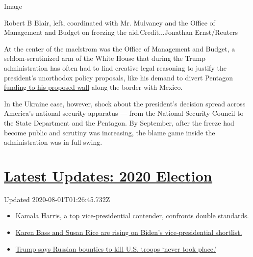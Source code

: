 Image

Robert B Blair, left, coordinated with Mr. Mulvaney and the Office of
Management and Budget on freezing the aid.Credit...Jonathan
Ernst/Reuters

At the center of the maelstrom was the Office of Management and Budget,
a seldom-scrutinized arm of the White House that during the Trump
administration has often had to find creative legal reasoning to justify
the president's unorthodox policy proposals, like his demand to divert
Pentagon
\href{https://www.nytimes.com/2019/09/03/us/politics/pentagon-border-wall.html}{funding
to his proposed wall} along the border with Mexico.

In the Ukraine case, however, shock about the president's decision
spread across America's national security apparatus --- from the
National Security Council to the State Department and the Pentagon. By
September, after the freeze had become public and scrutiny was
increasing, the blame game inside the administration was in full swing.

\hypertarget{latest-updates-2020-election}{%
\section{\texorpdfstring{\href{https://www.nytimes.com/2020/07/31/us/elections/biden-vs-trump.html?action=click\&pgtype=Article\&state=default\&region=MAIN_CONTENT_1\&context=storylines_live_updates}{Latest
Updates: 2020
Election}}{Latest Updates: 2020 Election}}\label{latest-updates-2020-election}}

Updated 2020-08-01T01:26:45.732Z

\begin{itemize}
\tightlist
\item
  \href{https://www.nytimes.com/2020/07/31/us/elections/biden-vs-trump.html?action=click\&pgtype=Article\&state=default\&region=MAIN_CONTENT_1\&context=storylines_live_updates\#link-29fdff45}{Kamala
  Harris, a top vice-presidential contender, confronts double
  standards.}
\item
  \href{https://www.nytimes.com/2020/07/31/us/elections/biden-vs-trump.html?action=click\&pgtype=Article\&state=default\&region=MAIN_CONTENT_1\&context=storylines_live_updates\#link-13ec3d9c}{Karen
  Bass and Susan Rice are rising on Biden's vice-presidential
  shortlist.}
\item
  \href{https://www.nytimes.com/2020/07/31/us/elections/biden-vs-trump.html?action=click\&pgtype=Article\&state=default\&region=MAIN_CONTENT_1\&context=storylines_live_updates\#link-49e9a016}{Trump
  says Russian bounties to kill U.S. troops `never took place.'}
\end{itemize}

